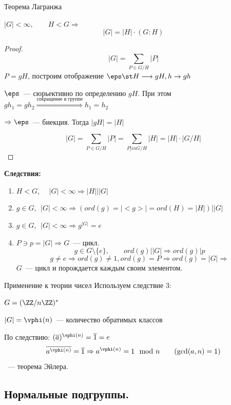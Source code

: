 \begin{Theorem}{Теорема Лагранжа}{}

    $|G| < \infty, \qquad H < G \Rightarrow$
    \[ |G| = |H|\cdot (G:H) \]
\end{Theorem}
\begin{proof}
    \[ |G| = \sum_{P \in G \slash H } |P| \]
    $P = gH$, построим отображение $\eps \st H \longrightarrow gH, h \rightarrow gh$

    $\eps$~--- сюрьективно по определению $gH$. При этом $gh_1 = gh_2 \overset{\text{сокращение в группе}}{\Rightarrow} h_1 = h_2$

    $\Rightarrow \eps$~--- биекция. Тогда $|gH| = |H|$

    \[ |G| = \sum_{P \in G \slash H } |P| = \sum_{P ]in G \slash H} |H| = |H| \cdot |G \slash H| \]
\end{proof}

\textbf{Следствия:}

\begin{enumerate}
    \item $H < G$, \ \ $|G| < \infty \Rightarrow |H| | |G|$
    \item $g \in G, \ \ |G| < \infty \Rightarrow (ord(g) = |<g>| = ord(H) = |H|) | |G|$
    \item $g \in G, \ \ |G| < \infty \Rightarrow g^{|G|} = e$
    \item $P \ni p = |G| \Rightarrow G$~--- цикл.
    \[ g \in G \setminus \{e\}, \qquad ord(g) | |G| \Rightarrow ord(g) | p \]
    \[ g \not = e \Rightarrow ord(g) \not = 1, ord(g) = P \Rightarrow ord(g) = |G| \Rightarrow\]
    $G$~--- цикл и порождается каждым своим элементом.
\end{enumerate}

\begin{Example}{Применение к теории чисел}{}
    Используем следствие 3:

    $G = (\ZZ \slash n\ZZ)^*$

    $|G| = \vphi(n)$~--- количество обратимых классов

    По следствию: $(\overline{a})^{\vphi(n)} = \overline{1} = e$
    \[\overline{a^{\vphi(n)}} = \overline{1} \Rightarrow a^{\vphi(n)} = 1 \mod n \qquad (\gcd(a, n) = 1) \]~--- теорема Эйлера.
\end{Example}

\subsection{Нормальные подгруппы.}

